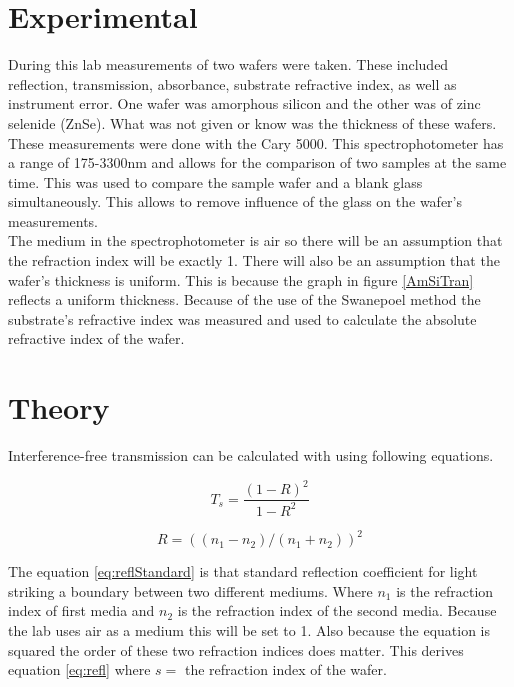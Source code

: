 \documentclass[10pt,a4paper]{article}
\begin{document}
\begin{multicols}{2}
\section*{Experimental}
During this lab measurements of two wafers were taken. These included reflection, transmission, absorbance, substrate refractive index, as well as instrument error. One wafer was amorphous silicon and the other was of zinc selenide (ZnSe). What was not given or know was the thickness of these wafers. These measurements were done with the Cary 5000. This spectrophotometer has a range of 175-3300nm \cite{carry} and allows for the comparison of two samples at the same time. This was used to compare the sample wafer and a blank glass simultaneously. This allows to remove influence of the glass on the wafer's measurements.\\
The medium in the spectrophotometer is air so there will be an assumption that the refraction index will be exactly 1. There will also be an assumption that the wafer's thickness is uniform. This is because the graph in figure \ref{AmSiTran} reflects a uniform thickness\cite{paper}. Because of the use of the Swanepoel method the substrate's refractive index was measured and used to calculate the absolute refractive index of the wafer. 





	

\section*{Theory}

Interference-free transmission can be calculated with using following equations.

\begin{equation}
\label{eq:trans}
T_s = \dfrac{(1-R)^2}{1-R^2}
\end{equation}

\begin{equation}
\label{eq:reflStandard}
R = ((n_1-n_2)/(n_1+n_2))^2
\end{equation}

The equation \ref{eq:reflStandard} is that standard reflection coefficient for light striking a boundary between two different mediums. Where $n_1$ is the refraction index of first media and $n_2$ is the refraction index of the second media. Because the lab uses air as a medium this will be set to 1. Also because the equation is squared the order of these two refraction indices does matter. This derives equation \ref{eq:refl} where $s =$ the refraction index of the wafer.


\end{multicols}
\end{document}
